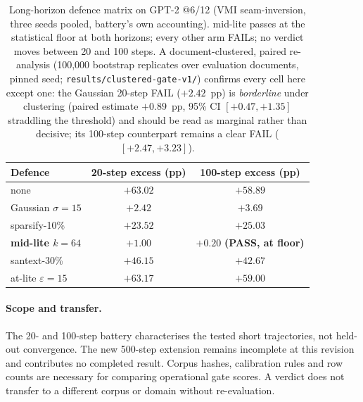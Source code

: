 \documentclass[11pt]{article}
\newcommand{\pp}{pp}
\begin{document}
\begin{table}[t]
\centering\small
\caption{Long-horizon defence matrix on GPT-2 @6/12 (VMI seam-inversion,
three seeds pooled, battery's own accounting). mid-lite passes at the
statistical floor at both horizons; every other arm FAILs; no verdict
moves between 20 and 100 steps. A document-clustered, paired re-analysis
(100{,}000 bootstrap replicates over evaluation documents, pinned seed;
\texttt{results/clustered-gate-v1/}) confirms every cell here except one:
the Gaussian 20-step FAIL ($+2.42$~\pp) is \emph{borderline} under
clustering (paired estimate $+0.89$~\pp, 95\% CI $[+0.47, +1.35]$
straddling the threshold) and should be read as marginal rather than
decisive; its 100-step counterpart remains a clear FAIL
($[+2.47, +3.23]$).}
\label{tab:horizon}
\begin{tabular}{@{}lcc@{}}
\toprule
Defence & 20-step excess (\pp) & 100-step excess (\pp) \\
\midrule
none & $+63.02$ & $+58.89$ \\
Gaussian $\sigma{=}15$ & $+2.42$ & $+3.69$ \\
sparsify-10\% & $+23.52$ & $+25.03$ \\
\textbf{mid-lite $k{=}64$} & $\mathbf{+1.00}$ & $\mathbf{+0.20}$ \textbf{(PASS, at floor)} \\
santext-30\% & $+46.15$ & $+42.67$ \\
at-lite $\varepsilon{=}15$ & $+63.17$ & $+59.00$ \\
\bottomrule
\end{tabular}
\end{table}

\paragraph{Scope and transfer.}
The 20- and 100-step battery characterises the tested short trajectories, not held-out convergence. The new 500-step extension remains incomplete at this revision and contributes no completed result. Corpus hashes, calibration rules and row counts are necessary for comparing operational gate scores. A verdict does not transfer to a different corpus or domain without re-evaluation.
\end{document}
